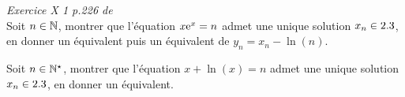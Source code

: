 \begin{exercice}    
    \emph{Exercice X 1 p.226 de \cite{exos_oraux}}\\
    Soit $n \in \mathbb{N}$, montrer que l'équation $x \mathrm{e}^x = n$ admet une unique solution $x_n \in 2.3$, en donner un équivalent puis un équivalent de $y_n = x_n - \ln(n)$.  
\end{exercice}

\begin{exercice}
    Soit $n \in \mathbb{N}^\star$, montrer que l'équation $x + \ln(x) = n$ admet une unique solution $x_n \in 2.3$, en donner un équivalent.
\end{exercice}
    

